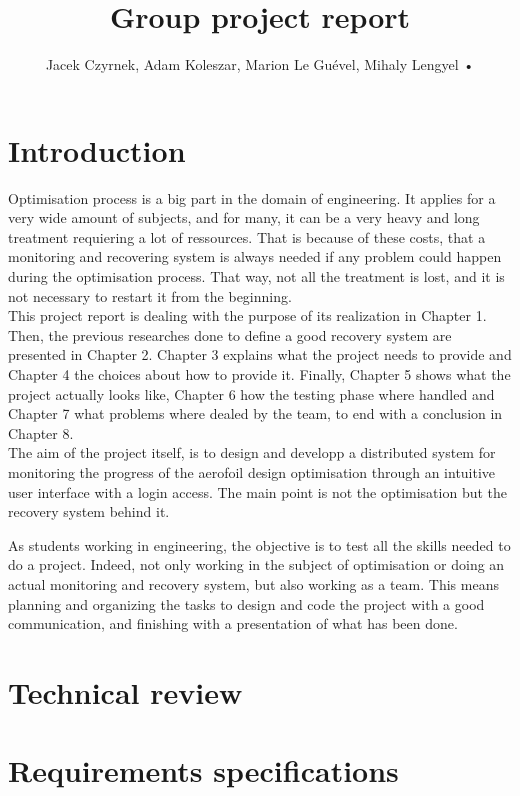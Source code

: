 \documentclass[10pt,a4paper]{report}
\author{Jacek Czyrnek, Adam Koleszar, Marion Le Guével, Mihaly Lengyel
•
}
\title{Group project report}
\begin{document}
\maketitle
\tableofcontents

\chapter{Introduction}
Optimisation process is a big part in the domain of engineering. It applies for a very wide amount of subjects, and for many, it can be a very heavy and long treatment requiering a lot of ressources. That is because of these costs, that a monitoring and recovering system is always needed if any problem could happen during the optimisation process. That way, not all the treatment is lost, and it is not necessary to restart it from the beginning.\\

This project report is dealing with the purpose of its realization in Chapter 1. Then, the previous researches done to define a good recovery system are presented in Chapter 2. Chapter 3 explains what the project needs to provide and Chapter 4 the choices about how to provide it. Finally, Chapter 5 shows what the project actually looks like, Chapter 6 how the testing phase where handled and Chapter 7 what problems where dealed by the team, to end with a conclusion in Chapter 8.\\

The aim of the project itself, is to design and developp a distributed system for monitoring the progress of the aerofoil design optimisation through an intuitive user interface with a login access. The main point is not the optimisation but the recovery system behind it.

As students working in engineering, the objective is to test all the skills needed to do a project. Indeed, not only working in the subject of optimisation or doing an actual monitoring and recovery system, but also working as a team. This means planning and organizing the tasks to design and code the project with a good communication, and finishing with a presentation of what has been done.

\chapter{Technical review}


\chapter{Requirements specifications}
\end{document}
